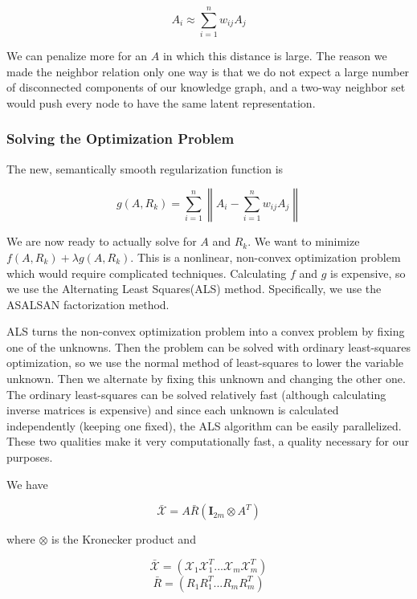\documentclass[pageno]{jpaper}
\newcommand{\norm}[1]{\left\lVert#1\right\rVert}
\begin{document}
$$ A_i \approx \sum_{i=1}^n w_{ij}A_j$$

 We can penalize more for an $A$ in which this distance is large. The reason we
 made the neighbor relation only one way is that we do not expect a large number
 of disconnected components of our knowledge graph, and a two-way neighbor set
 would push every node to have the same latent representation. \\

\subsubsection{Solving the Optimization Problem}
\label{Solving the Optimization Problem}

The new, semantically smooth regularization function is

\begin{equation}
    \label{eq: new g}
    g(A, R_k) = \sum_{i=1}^n \norm{A_i - \sum_{i=1}^n w_{ij}A_j}
\end{equation}

We are now ready to actually solve for $A$ and $R_k$. We want to minimize $f(A,
R_k) + \lambda g(A, R_k)$. This is a nonlinear, non-convex optimization problem
which would require complicated techniques. Calculating $f$ and $g$ is
expensive, so we use the Alternating Least Squares(ALS) method\cite{Koren2009}.
Specifically, we use the ASALSAN factorization method\cite{Bader2007}.

ALS turns the non-convex optimization problem into a convex problem by fixing
one of the unknowns. Then the problem can be solved with ordinary least-squares
optimization, so we use the normal method of least-squares to lower the
variable unknown. Then we alternate by fixing this unknown and changing the
other one. The ordinary least-squares can be solved relatively fast (although
calculating inverse matrices is expensive) and since each unknown is calculated
independently (keeping one fixed), the ALS algorithm can be easily parallelized.
These two qualities make it very computationally fast, a quality necessary for
our purposes.

We have

$$\bar{\mathcal{X}} = A\bar{R}(\mathbf{I}_{2m} \otimes A^T)$$

where $\otimes$ is the Kronecker product and

$$\bar{\mathcal{X}} = \left( \mathcal{X}_1\mathcal{X}_1^T ... \mathcal{X}_m\mathcal{X}_m^T \right)$$
$$\bar{R} = \left( R_1 R_1^T ... R_mR_m^T \right)$$
\end{document}
